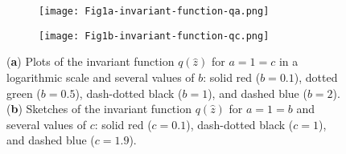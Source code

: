 \documentclass[symmetry,article,accept,moreauthors,pdftex,a4paper]{mdpi}
\begin{document}
\begin{figure}[H]
\widefigure
\begin{subfigure}{0.45\textwidth}
\caption{} \vspace{0.1cm}
\texttt{[image: Fig1a-invariant-function-qa.png]}
\end{subfigure} \hspace*{0.5cm}
\begin{subfigure}{0.45\textwidth}
\caption{} \vspace{0.1cm}
\texttt{[image: Fig1b-invariant-function-qc.png]}
\end{subfigure}
\caption{(\textbf{a}) Plots of the invariant function $q(\widehat{z})$ for $a = 1 = c$ in a logarithmic scale and several values of $b$: solid red ($b = 0.1$), dotted green ($b = 0.5$), dash-dotted black ($b = 1$), and dashed blue ($b = 2$). (\textbf{b}) Sketches of the invariant function $q(\widehat{z})$ for $a = 1 = b$ and several values of $c$: solid red ($c = 0.1$), dash-dotted black ($c = 1$), and dashed blue ($c = 1.9$).}	\label{invariant-plot}
\end{figure}
\end{document}
